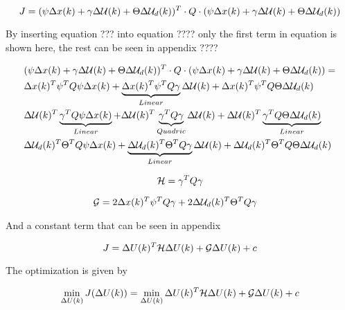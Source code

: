 \begin{equation}
	J = (\psi\Delta x(k) + \gamma\Delta \CMcal{U}(k) + \Theta\Delta \CMcal{U}_d(k))^T\cdot Q \cdot (\psi\Delta x(k) + \gamma\Delta \CMcal{U}(k) + \Theta\Delta \CMcal{U}_d(k))
\end{equation}



By inserting equation ??? into equation ???? only the first term in equation is shown here, the rest can be seen in appendix ????

\begin{equation}
	\begin{aligned}
	&(\psi\Delta x(k) + \gamma\Delta \CMcal{U}(k) + \Theta\Delta \CMcal{U}_d(k))^T\cdot Q \cdot (\psi\Delta x(k) + \gamma\Delta \CMcal{U}(k) + \Theta\Delta \CMcal{U}_d(k)) = \\
	& \Delta x(k)^T\psi ^T Q \psi \Delta x(k) 								+ \underbrace{\Delta x(k)^T \psi ^T Q \gamma}_{Linear} \Delta  \CMcal{U}(k) 				+\Delta x(k)^T \psi ^T Q \Theta \Delta \CMcal{U}_d(k) \\
	& \Delta \CMcal{U}(k)^T \underbrace{\gamma ^T Q \psi\Delta x(k)}_{Linear} + \Delta \CMcal{U}(k)^T\underbrace{\gamma ^T Q \gamma}_{Quadric} \Delta \CMcal{U}(k)+\Delta \CMcal{U}(k)^T \underbrace{\gamma ^T Q\Theta \Delta \CMcal{U}_d(k)}_{Linear} \\ 
	& \Delta \CMcal{U}_d(k)^T \Theta ^T Q  \psi \Delta x(k)					+ \underbrace{\Delta \CMcal{U}_d(k)^T \Theta ^T Q \gamma }_{Linear} \Delta \CMcal{U}(k) 	+\Delta \CMcal{U}_d(k)^T \Theta ^T Q \Theta \Delta \CMcal{U}_d(k)
	\end{aligned}
\end{equation}



\begin{equation}
	\CMcal{H} = \gamma^T Q\gamma 
\end{equation}

\begin{equation}
	\begin{aligned}
	\CMcal{G} &= 2 \Delta x(k)^T\psi^T Q \gamma+2 \Delta \CMcal{U}_d(k)^T\Theta^T Q \gamma 
	\end{aligned}
\end{equation}

And a constant term that can be seen in appendix

\begin{equation}
	J = \Delta U(k)^T\CMcal{H}\Delta U(k)+ \CMcal{G}\Delta U(k)+ c
\end{equation}

The optimization is given by

\begin{equation}
	\min_{\Delta U(k)} J(\Delta U(k)) =\min_{\Delta U(k)} \Delta U(k)^T\CMcal{H}\Delta U(k)+\CMcal{G}\Delta U(k)+c
\end{equation}